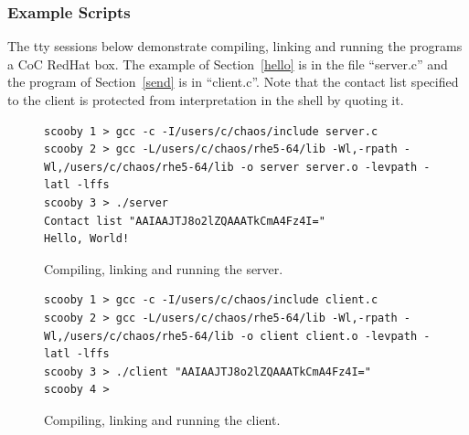 \documentclass[11pt]{article}
\begin{document}
\subsubsection{Example Scripts}
The tty sessions below demonstrate compiling, linking and running the
programs a CoC RedHat box.  The example of Section~\ref{hello} is in
the file ``server.c'' and the program of Section~\ref{send} is in
``client.c''.  Note that the contact list specified to the client is
protected from interpretation in the shell by quoting it.
\begin{figure}[ht]
\begin{verbatim}
scooby 1 > gcc -c -I/users/c/chaos/include server.c
scooby 2 > gcc -L/users/c/chaos/rhe5-64/lib -Wl,-rpath -Wl,/users/c/chaos/rhe5-64/lib -o server server.o -levpath -latl -lffs
scooby 3 > ./server
Contact list "AAIAAJTJ8o2lZQAAATkCmA4Fz4I="
Hello, World!
\end{verbatim}
\caption{Compiling, linking and running the server.}
\end{figure}
\begin{figure}[ht]
\begin{verbatim}
scooby 1 > gcc -c -I/users/c/chaos/include client.c
scooby 2 > gcc -L/users/c/chaos/rhe5-64/lib -Wl,-rpath -Wl,/users/c/chaos/rhe5-64/lib -o client client.o -levpath -latl -lffs
scooby 3 > ./client "AAIAAJTJ8o2lZQAAATkCmA4Fz4I="
scooby 4 >
\end{verbatim}
\caption{Compiling, linking and running the client.}
\end{figure}
\end{document}
